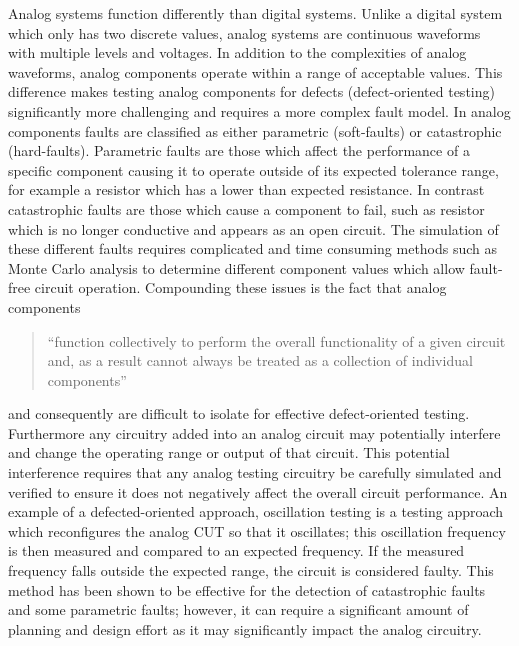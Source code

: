 \documentclass[12pt]{report}
\begin{document}
Analog systems function differently than digital systems.  Unlike a digital system which only has two discrete values, analog systems are continuous waveforms with multiple levels and voltages\cite{syschip}.  In addition to the complexities of analog waveforms, analog components operate within a range of acceptable values\cite{syschip}.  This difference makes testing analog components for defects (defect-oriented testing) significantly more challenging and requires a more complex fault model.  In analog components faults are classified as either parametric (soft-faults) or catastrophic (hard-faults)\cite{analogfaults}.  Parametric faults are those which affect the performance of a specific component causing it to operate outside of its expected tolerance range, for example a resistor which has a lower than expected resistance.  In contrast catastrophic faults are those which cause a component to fail, such as resistor which is no longer conductive and appears as an open circuit\cite{analogfaults}.  The simulation of these different faults requires complicated and time consuming methods such as Monte Carlo analysis to determine different component values which allow fault-free circuit operation\cite{syschip}.  Compounding these issues is the fact that analog components
\begin{quote}
``function collectively to perform the overall functionality of a given circuit and, as a result cannot always be treated as a collection of individual components\cite{syschip}''
\end{quote}
and consequently are difficult to isolate for effective defect-oriented testing\cite{analogmixedtest}.  Furthermore any circuitry added into an analog circuit may potentially interfere and change the operating range or output of that circuit\cite{syschip}.  This potential interference requires that any analog testing circuitry be carefully simulated and verified to ensure it does not negatively affect the overall circuit performance.  An example of a defected-oriented approach, oscillation testing is a testing approach which reconfigures the analog CUT so that it oscillates; this oscillation frequency is then measured and compared to an expected frequency.  If the measured frequency falls outside the expected range, the circuit is considered faulty\cite{analogosc}.  This method has been shown to be effective for the detection of catastrophic faults and some parametric faults; however, it can require a significant amount of planning and design effort as it may significantly impact the analog circuitry\cite{analogosc}\cite{syschip}.
\end{document}
